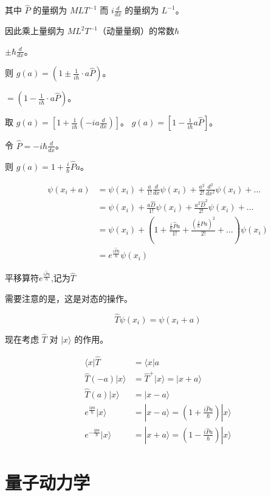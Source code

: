 \documentclass[lang=cn,10pt]{elegantbook}
\begin{document}
其中 $\hat{P}$ 的量纲为 $MLT^{-1}$ 而 $i \frac{d}{dx}$ 的量纲为 $L^{-1}$。

因此乘上量纲为 $ML^2T^{-1}$（动量量纲）的常数$\hbar$

 $\pm \hbar\frac{d}{dx}$。

则 $g(a) = (1 \pm \frac{1}{i\hbar} \cdot a \hat{P})$。

$= (1 - \frac{1}{i\hbar} \cdot a \hat{P})$。

取 $g(a) = [1 + \frac{1}{i\hbar} ( - i a \frac{d}{dx})]$。
$g(a) = [1 - \frac{1}{i\hbar} a \hat{P}]$。

令 $\hat{P} = - i \hbar \frac{d}{dx}$。

则 $g(a) = 1 + \frac{i}{\hbar} \hat{P} a$。

\begin{align*}
	\psi(x_i + a) & = \psi(x_i) + \frac{a}{1!} \frac{d}{dx} \psi(x_i) + \frac{a^2}{2!} \frac{d^2}{dx^2} \psi(x_i) + \ldots \\
	& = \psi(x_i) + \frac{a \hat{D}}{1!} \psi(x_i) + \frac{a^2 \hat{D}^2}{2!} \psi(x_i) + \ldots \\
	& = \psi(x_i) + \left(1 + \frac{\frac{i}{\hbar}\hat{P} a}{1!} + \frac{(\frac{i}{\hbar}\hat{P} a)^2}{2!} + \ldots \right) \psi(x_i) \\
	& = e^{\frac{i \hat{P} a}{\hbar}} \psi(x_i)
\end{align*}

平移算符$e^{\frac{i \hat{P} a}{\hbar}}$,记为$\hat{T}$

需要注意的是，这是对态的操作。

\[
\hat{T} \psi(x_i) = \psi(x_i + a)
\]

现在考虑 $\hat{T}$ 对 $|x\rangle$ 的作用。

\begin{align*}
	\langle x | \hat{T} & = \langle x | a \\
	\hat{T}(-a) | x \rangle & = \hat{T}^+ | x \rangle = | x + a \rangle \\
	\hat{T}(a) | x \rangle & = | x - a \rangle \\
	e^{\frac{i p a}{\hbar}} | x \rangle & = | x - a \rangle = \left( 1 + \frac{i \hat{P} a}{\hbar} \right) | x \rangle \\
	e^{-\frac{i p a}{\hbar}} | x \rangle & = | x + a \rangle = \left( 1 - \frac{i \hat{P} a}{\hbar} \right) | x \rangle
\end{align*}
\chapter{量子动力学}
\end{document}
